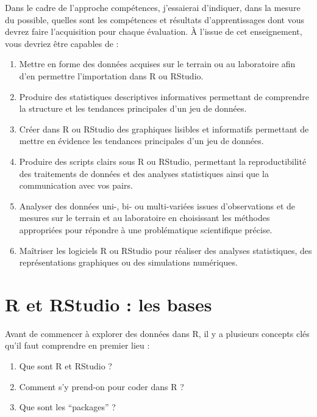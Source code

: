 \documentclass[
  a4paper,
]{article}
\providecommand{\tightlist}{%
  \setlength{\itemsep}{0pt}\setlength{\parskip}{0pt}}
\begin{document}
\begin{enumerate}
\end{enumerate}

Dans le cadre de l'approche compétences, j'essaierai d'indiquer, dans la mesure du possible, quelles sont les compétences et résultats d'apprentissages dont vous devrez faire l'acquisition pour chaque évaluation. À l'issue de cet enseignement, vous devriez être capables de :

\begin{enumerate}
\def\labelenumi{\arabic{enumi}.}
\tightlist
\item
  Mettre en forme des données acquises sur le terrain ou au laboratoire afin d'en permettre l'importation dans R ou RStudio.
\item
  Produire des statistiques descriptives informatives permettant de comprendre la structure et les tendances principales d'un jeu de données.
\item
  Créer dans R ou RStudio des graphiques lisibles et informatifs permettant de mettre en évidence les tendances principales d'un jeu de données.
\item
  Produire des scripts clairs sous R ou RStudio, permettant la reproductibilité des traitements de données et des analyses statistiques ainsi que la communication avec vos pairs.
\item
  Analyser des données uni-, bi- ou multi-variées issues d'observations et de mesures sur le terrain et au laboratoire en choisissant les méthodes appropriées pour répondre à une problématique scientifique précise.
\item
  Maîtriser les logiciels R ou RStudio pour réaliser des analyses statistiques, des représentations graphiques ou des simulations numériques.
\end{enumerate}

\hypertarget{bases}{%
\section{R et RStudio : les bases}\label{bases}}

Avant de commencer à explorer des données dans R, il y a plusieurs concepts clés qu'il faut comprendre en premier lieu :

\begin{enumerate}
\def\labelenumi{\arabic{enumi}.}
\tightlist
\item
  Que sont R et RStudio ?
\item
  Comment s'y prend-on pour coder dans R ?
\item
  Que sont les ``packages'' ?
\end{enumerate}
\end{document}
